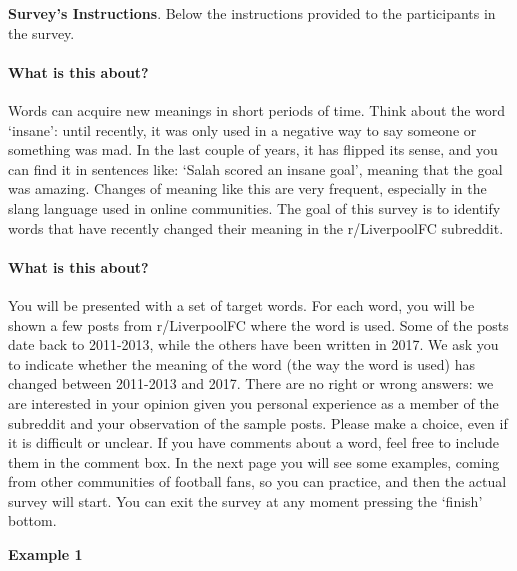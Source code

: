 \documentclass[11pt,a4paper]{article}
\begin{document}
\clearpage


\begin{minipage}{15cm}

\textbf{Survey's Instructions}. Below the instructions provided to the participants in the survey.

\vspace*{0.5cm}

\paragraph{What is this about?}
Words can acquire new meanings in short periods of time. Think about the word `insane': until recently, it was only used in a negative way to say someone or something was mad. In the last couple of years, it has flipped its sense, and you can find it in sentences like: `Salah scored an insane goal', meaning that the goal was amazing.
Changes of meaning like this are very frequent, especially in the slang language used in online communities. The goal of this survey is to identify words that have recently changed their meaning in the r/LiverpoolFC subreddit.
\\
\paragraph{What is this about?}
You will be presented with a set of target words. For each word, you will be shown a few posts from r/LiverpoolFC where the word is used. Some of the posts date back to 2011-2013, while the others have been written in 2017.
We ask you to indicate whether the meaning of the word (the way the word is used) has changed between 2011-2013 and 2017. There are no right or wrong answers: we are interested in your opinion given you personal experience as a member of the subreddit and your observation of the sample posts. Please make a choice, even if it is difficult or unclear. If you have comments about a word, feel free to include them in the comment box. In the next page you will see some examples, coming from other communities of football fans, so you can practice, and then the actual survey will start. You can exit the survey at any moment pressing the `finish' bottom. 

\vspace*{0.5cm}

\textbf{Example 1}

\vspace*{0.5cm}


\end{minipage}
\end{document}
